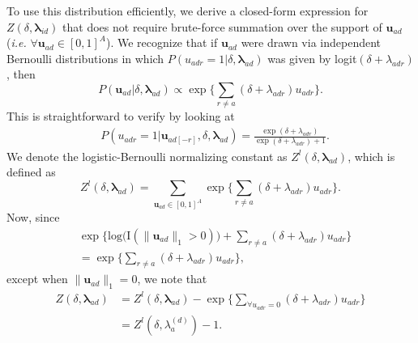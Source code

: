\documentclass{article}
\begin{document}
 	 To use this distribution efficiently, we derive a closed-form expression for $Z(\delta,\boldsymbol{\lambda}_{id})$ that does not require brute-force summation over the support of $\boldsymbol{u}_{ad}$ (\textit{i.e.} $\forall \boldsymbol{u}_{ad} \in [0,1]^A$). We recognize that if $\boldsymbol{u}_{ad}$ were drawn via independent Bernoulli distributions in which $P({u}_{adr}=1|\delta, \boldsymbol{\lambda}_{ad})$ was given by logit$(\delta+\lambda_{adr})$, then 
 	 \begin{equation*}
 	 	P(\boldsymbol{u}_{ad}|\delta, \boldsymbol{\lambda}_{ad}) \propto \exp\Big\{\sum_{r \neq a } (\delta+\lambda_{adr})u_{adr}\Big\}.  	 
 	 \end{equation*}
 	 This is straightforward to verify by looking at 
 	 \begin{equation*}
 	 	\begin{aligned}
 	 		&P(u_{adr}=1|\boldsymbol{u}_{ad[-r]}, \delta, \boldsymbol{\lambda}_{ad})
 	 		=\frac{ \exp{(\delta+\lambda_{adr})}}{\exp{(\delta+\lambda_{adr})} + 1}.\end{aligned}\end{equation*}
 	 We denote the logistic-Bernoulli normalizing constant as $Z^{l}(\delta,\boldsymbol{\lambda}_{ad})$, which is defined as 
 	 \begin{equation*}
 	 	Z^{l}(\delta,\boldsymbol{\lambda}_{ad})=\sum_{\boldsymbol{u}_{ad} \in [0,1]^{A}} \exp\Big\{\sum_{r\neq a} (\delta+\lambda_{adr})u_{adr}\Big\}.
 	 \end{equation*}
 	 Now, since 
 	 \begin{equation*}
 	 	\begin{aligned}
 	 		&\exp\Big\{ \mbox{log}\Big(\text{I}(\lVert \boldsymbol{u}_{ad} \rVert_1 > 0)\Big) + \sum_{r \neq a} (\delta+\lambda_{adr})u_{adr} \Big\}\\&= \exp\Big\{  \sum_{r \neq a} (\delta+\lambda_{adr})u_{adr} \Big\},
 	 	\end{aligned}
 	 \end{equation*}
 	 except when $\lVert \boldsymbol{u}_{ad} \rVert_1=0$, we note that 
 	 \begin{equation*}
 	 	\begin{aligned}
 	 		Z(\delta,\boldsymbol{\lambda}_{ad})& = Z^{l}(\delta,\boldsymbol{\lambda}_{ad}) -\exp\Big\{ \sum\limits_{\forall u_{adr}=0}(\delta+\lambda_{adr})u_{adr} \Big\}
 	 		\\& = Z^{l}(\delta,\lambda_{a}^{(d)}) -  1.
 	 	\end{aligned}
 	 \end{equation*}
\end{document}
